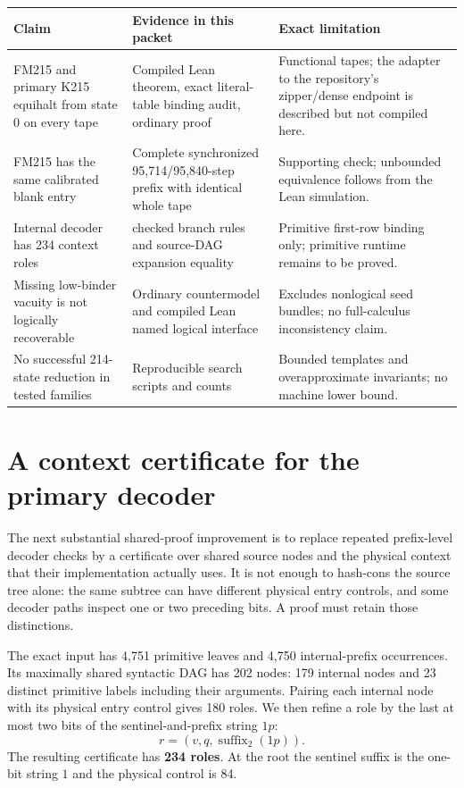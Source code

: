 \documentclass[11pt,a4paper]{article}
\begin{document}
\begin{longtable}{@{}>{\raggedright\arraybackslash}p{}>{\raggedright\arraybackslash}p{}>{\raggedright\arraybackslash}p{}@{}}
\toprule
Claim & Evidence in this packet & Exact limitation\\
\midrule
\endhead
FM215 and primary K215 equihalt from state 0 on every tape &
Compiled Lean theorem, exact literal-table binding audit, ordinary proof &
Functional tapes; the adapter to the repository's zipper/dense endpoint
is described but not compiled here.\\[5pt]
FM215 has the same calibrated blank entry &
Complete synchronized 95,714/95,840-step prefix with identical whole tape &
Supporting check; unbounded equivalence follows from the Lean simulation.\\[5pt]
Internal decoder has 234 context roles &
468 checked branch rules and source-DAG expansion equality &
Primitive first-row binding only; primitive runtime remains to be proved.\\[5pt]
Missing low-binder vacuity is not logically recoverable &
Ordinary countermodel and compiled Lean named logical interface &
Excludes nonlogical seed bundles; no full-calculus inconsistency claim.\\[5pt]
No successful 214-state reduction in tested families &
Reproducible search scripts and counts &
Bounded templates and overapproximate invariants; no machine lower bound.\\
\bottomrule
\end{longtable}



\section{A context certificate for the primary decoder}
\label{sec:decoder}

The next substantial shared-proof improvement is to replace repeated
prefix-level decoder checks by a certificate over shared source nodes
and the physical context that their implementation actually uses. It is
not enough to hash-cons the source tree alone: the same subtree can have
different physical entry controls, and some decoder paths inspect one or
two preceding bits. A proof must retain those distinctions.

The exact  input has 4,751 primitive leaves and 4,750
internal-prefix occurrences. Its maximally shared syntactic DAG has 202
nodes: 179 internal nodes and 23 distinct primitive labels including their
arguments. Pairing each internal node with its physical entry control
gives 180 roles. We then refine a role by the last at most two bits of the
sentinel-and-prefix string $1p$:
\[
 r=(v,q,\operatorname{suffix}_2(1p)).
\]
The resulting certificate has \textbf{234 roles}. At the root the sentinel
suffix is the one-bit string $1$ and the physical control is 84.
\end{document}
